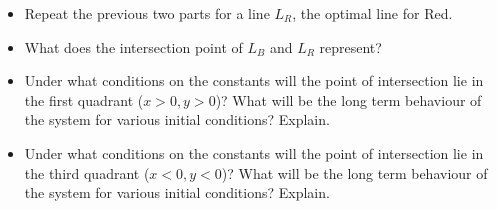 \begin{enumerate}[label=\emph{\arabic*.}]
\begin{enumerate}[label=\emph{(\alph*)}]
\begin{itemize}

\item Repeat the previous two parts for a line $L_R$, the optimal line for Red.


\item What does the intersection point of $L_B$ and $L_R$ represent?


\item Under what conditions on the constants will the point of intersection lie in the first quadrant ($x>0, y>0$)? What will be the long term behaviour of the system for various initial conditions? Explain.



\item Under what conditions on the constants will the point of intersection lie in the third quadrant ($x<0, y<0$)? What will be the long term behaviour of the system for various initial conditions? Explain.



\end{itemize}



\end{enumerate}
\end{enumerate}
